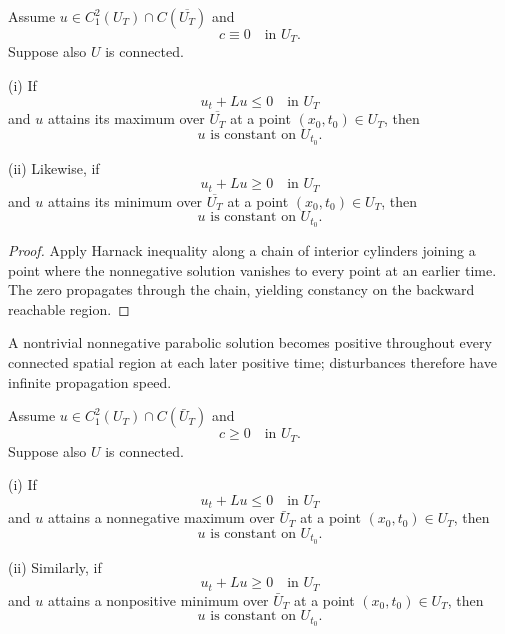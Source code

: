 \begin{theorem}
\label{thm:parabolic-strong-maximum-principle}

Assume $u \in C_1^2(U_T) \cap C(\overline{U_T})$ and
\[
c \equiv 0 \quad \text{in } U_T.
\]
Suppose also $U$ is connected.

(i) If
\[
u_t + Lu \leq 0 \quad \text{in } U_T
\]
and $u$ attains its maximum over $\overline{U_T}$ at a point $(x_0, t_0) \in U_T$, then
\[
u \text{ is constant on } U_{t_0}.
\]

(ii) Likewise, if
\[
u_t + Lu \geq 0 \quad \text{in } U_T
\]
and $u$ attains its minimum over $\overline{U_T}$ at a point $(x_0, t_0) \in U_T$, then
\[
u \text{ is constant on } U_{t_0}.
\]
\end{theorem}

\begin{proof}
\sketch Apply Harnack inequality along a chain of interior cylinders joining a point where the nonnegative solution vanishes to every point at an earlier time. The zero propagates through the chain, yielding constancy on the backward reachable region.
\end{proof}

\begin{remark}
\label{rem:parabolic-infinite-propagation-speed}

A nontrivial nonnegative parabolic solution becomes positive throughout every connected spatial region at each later positive time; disturbances therefore have infinite propagation speed.
\end{remark}

\begin{theorem}
\label{thm:parabolic-strong-maximum-principle-c-nonneg}

Assume $u \in C_1^2(U_T) \cap C(\bar{U}_T)$ and
\[
c \geq 0 \quad \text{in } U_T.
\]
Suppose also $U$ is connected.

(i) If
\[
u_t + Lu \leq 0 \quad \text{in } U_T
\]
and $u$ attains a nonnegative maximum over $\bar{U}_T$ at a point $(x_0, t_0) \in U_T$, then
\[
u \text{ is constant on } U_{t_0}.
\]

(ii) Similarly, if
\[
u_t + Lu \geq 0 \quad \text{in } U_T
\]
and $u$ attains a nonpositive minimum over $\bar{U}_T$ at a point $(x_0, t_0) \in U_T$, then
\[
u \text{ is constant on } U_{t_0}.
\]
\end{theorem}

